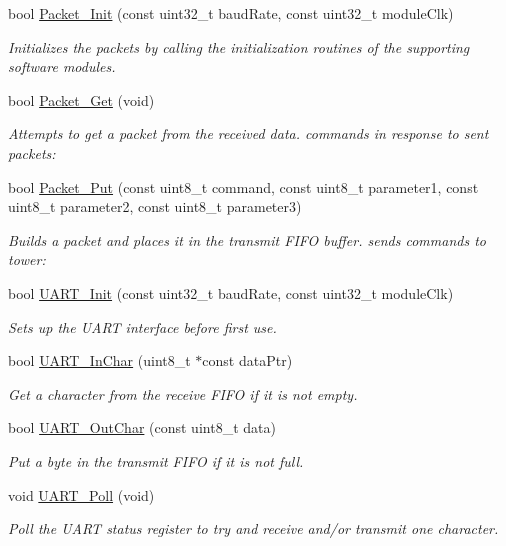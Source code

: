\begin{DoxyCompactItemize}
\item 
bool \hyperlink{group__main__module_ga414aa3f521fdfd6e4586d98a946b6ab2}{Packet\+\_\+\+Init} (const uint32\+\_\+t baud\+Rate, const uint32\+\_\+t module\+Clk)
\begin{DoxyCompactList}\small\item\em Initializes the packets by calling the initialization routines of the supporting software modules. \end{DoxyCompactList}\item 
bool \hyperlink{group__main__module_gac58a17928cd5e556e1567b2fde9f88f0}{Packet\+\_\+\+Get} (void)
\begin{DoxyCompactList}\small\item\em Attempts to get a packet from the received data. commands in response to sent packets\+: \end{DoxyCompactList}\item 
bool \hyperlink{group__main__module_ga431a1e1da25a8214a502ec81f88fc3f1}{Packet\+\_\+\+Put} (const uint8\+\_\+t command, const uint8\+\_\+t parameter1, const uint8\+\_\+t parameter2, const uint8\+\_\+t parameter3)
\begin{DoxyCompactList}\small\item\em Builds a packet and places it in the transmit F\+I\+F\+O buffer. sends commands to tower\+: \end{DoxyCompactList}\item 
bool \hyperlink{group__main__module_gae5760d1a086ec79a33901db253000af9}{U\+A\+R\+T\+\_\+\+Init} (const uint32\+\_\+t baud\+Rate, const uint32\+\_\+t module\+Clk)
\begin{DoxyCompactList}\small\item\em Sets up the U\+A\+R\+T interface before first use. \end{DoxyCompactList}\item 
bool \hyperlink{group__main__module_ga03049bcc3bf9af2a75ee77016d3b0d60}{U\+A\+R\+T\+\_\+\+In\+Char} (uint8\+\_\+t $\ast$const data\+Ptr)
\begin{DoxyCompactList}\small\item\em Get a character from the receive F\+I\+F\+O if it is not empty. \end{DoxyCompactList}\item 
bool \hyperlink{group__main__module_gab20ebaeefd1f29d31e098ade31189dda}{U\+A\+R\+T\+\_\+\+Out\+Char} (const uint8\+\_\+t data)
\begin{DoxyCompactList}\small\item\em Put a byte in the transmit F\+I\+F\+O if it is not full. \end{DoxyCompactList}\item 
void \hyperlink{group__main__module_ga799b375101827a18f652a3f28ecefcd0}{U\+A\+R\+T\+\_\+\+Poll} (void)
\begin{DoxyCompactList}\small\item\em Poll the U\+A\+R\+T status register to try and receive and/or transmit one character. \end{DoxyCompactList}\end{DoxyCompactItemize}
